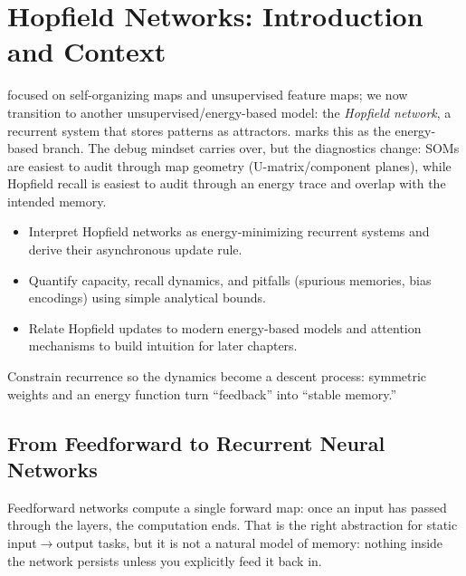 \section{Hopfield Networks: Introduction and Context}\label{chap:hopfield}

 focused on self-organizing maps and unsupervised feature maps; we now transition to another unsupervised/energy-based model: the \emph{Hopfield network}, a recurrent system that stores patterns as attractors.  marks this as the energy-based branch. The debug mindset carries over, but the diagnostics change: SOMs are easiest to audit through map geometry (U-matrix/component planes), while Hopfield recall is easiest to audit through an energy trace and overlap with the intended memory.

\begin{tcolorbox}[summarybox, title={Learning Outcomes}]
\begin{itemize}
    \item Interpret Hopfield networks as energy-minimizing recurrent systems and derive their asynchronous update rule.
    \item Quantify capacity, recall dynamics, and pitfalls (spurious memories, bias encodings) using simple analytical bounds.
    \item Relate Hopfield updates to modern energy-based models and attention mechanisms to build intuition for later chapters.
\end{itemize}
\end{tcolorbox}

\begin{tcolorbox}[summarybox, title={Design motif}]
Constrain recurrence so the dynamics become a descent process: symmetric weights and an energy function turn ``feedback'' into ``stable memory.''
\end{tcolorbox}

\subsection{From Feedforward to Recurrent Neural Networks}
\label{sec:hopfield_from_feedforward_to_recurrent_neural_networks}

Feedforward networks compute a single forward map: once an input has passed through the layers, the computation ends. That is the right abstraction for static input\(\rightarrow\)output tasks, but it is not a natural model of memory: nothing inside the network persists unless you explicitly feed it back in.

